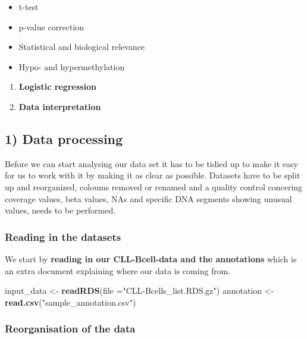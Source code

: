 \documentclass[]{article}
\newenvironment{Shaded}{\begin{snugshade}}{\end{snugshade}}
\newcommand{\KeywordTok}[1]{\textcolor[rgb]{0.13,0.29,0.53}{\textbf{#1}}}
\newcommand{\DataTypeTok}[1]{\textcolor[rgb]{0.13,0.29,0.53}{#1}}
\newcommand{\StringTok}[1]{\textcolor[rgb]{0.31,0.60,0.02}{#1}}
\newcommand{\NormalTok}[1]{#1}
\providecommand{\tightlist}{%
  \setlength{\itemsep}{0pt}\setlength{\parskip}{0pt}}
\begin{document}
\begin{itemize}
\tightlist
\item
  t-test
\item
  p-value correction
\item
  Statistical and biological relevance
\item
  Hypo- and hypermethylation
\end{itemize}

\begin{enumerate}
\def\labelenumi{\arabic{enumi}.}
\setcounter{enumi}{5}
\item
  \textbf{Logistic regression}
\item
  \textbf{Data interpretation}
\end{enumerate}

\subsection{1) Data processing}\label{data-processing}

Before we can start analysing our data set it has to be tidied up to
make it easy for us to work with it by making it as clear as possible.
Datasets have to be split up and reorganized, coloums removed or renamed
and a quality control concering coverage values, beta values, NAs and
specific DNA segments showing unusual values, needs to be performed.

\subsubsection{Reading in the datasets}\label{reading-in-the-datasets}

We start by \textbf{reading in our CLL-Bcell-data and the annotations}
which is an extra document explaining where our data is coming from.

\begin{Shaded}
\begin{Highlighting}[]
\NormalTok{input_data <-}\StringTok{ }\KeywordTok{readRDS}\NormalTok{(}\DataTypeTok{file =}\StringTok{"CLL-Bcells_list.RDS.gz"}\NormalTok{)}
\NormalTok{annotation <-}\StringTok{ }\KeywordTok{read.csv}\NormalTok{(}\StringTok{"sample_annotation.csv"}\NormalTok{)}
\end{Highlighting}
\end{Shaded}

\subsubsection{Reorganisation of the
data}\label{reorganisation-of-the-data}
\end{document}
